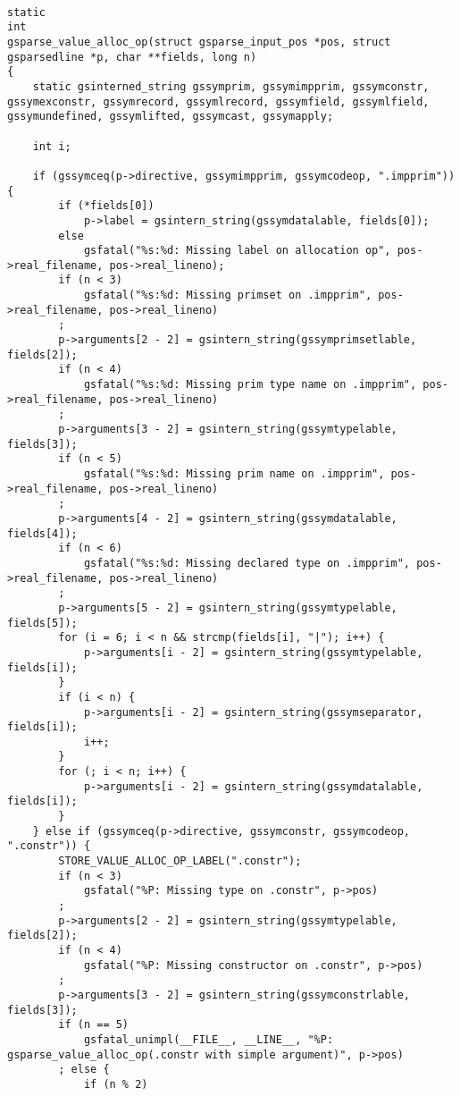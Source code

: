 \documentclass{report}
\begin{document}
\begin{verbatim}

static
int
gsparse_value_alloc_op(struct gsparse_input_pos *pos, struct gsparsedline *p, char **fields, long n)
{
    static gsinterned_string gssymprim, gssymimpprim, gssymconstr, gssymexconstr, gssymrecord, gssymlrecord, gssymfield, gssymlfield, gssymundefined, gssymlifted, gssymcast, gssymapply;

    int i;

    if (gssymceq(p->directive, gssymimpprim, gssymcodeop, ".impprim")) {
        if (*fields[0])
            p->label = gsintern_string(gssymdatalable, fields[0]);
        else
            gsfatal("%s:%d: Missing label on allocation op", pos->real_filename, pos->real_lineno);
        if (n < 3)
            gsfatal("%s:%d: Missing primset on .impprim", pos->real_filename, pos->real_lineno)
        ;
        p->arguments[2 - 2] = gsintern_string(gssymprimsetlable, fields[2]);
        if (n < 4)
            gsfatal("%s:%d: Missing prim type name on .impprim", pos->real_filename, pos->real_lineno)
        ;
        p->arguments[3 - 2] = gsintern_string(gssymtypelable, fields[3]);
        if (n < 5)
            gsfatal("%s:%d: Missing prim name on .impprim", pos->real_filename, pos->real_lineno)
        ;
        p->arguments[4 - 2] = gsintern_string(gssymdatalable, fields[4]);
        if (n < 6)
            gsfatal("%s:%d: Missing declared type on .impprim", pos->real_filename, pos->real_lineno)
        ;
        p->arguments[5 - 2] = gsintern_string(gssymtypelable, fields[5]);
        for (i = 6; i < n && strcmp(fields[i], "|"); i++) {
            p->arguments[i - 2] = gsintern_string(gssymtypelable, fields[i]);
        }
        if (i < n) {
            p->arguments[i - 2] = gsintern_string(gssymseparator, fields[i]);
            i++;
        }
        for (; i < n; i++) {
            p->arguments[i - 2] = gsintern_string(gssymdatalable, fields[i]);
        }
    } else if (gssymceq(p->directive, gssymconstr, gssymcodeop, ".constr")) {
        STORE_VALUE_ALLOC_OP_LABEL(".constr");
        if (n < 3)
            gsfatal("%P: Missing type on .constr", p->pos)
        ;
        p->arguments[2 - 2] = gsintern_string(gssymtypelable, fields[2]);
        if (n < 4)
            gsfatal("%P: Missing constructor on .constr", p->pos)
        ;
        p->arguments[3 - 2] = gsintern_string(gssymconstrlable, fields[3]);
        if (n == 5)
            gsfatal_unimpl(__FILE__, __LINE__, "%P: gsparse_value_alloc_op(.constr with simple argument)", p->pos)
        ; else {
            if (n % 2)

\end{verbatim}
\end{document}
